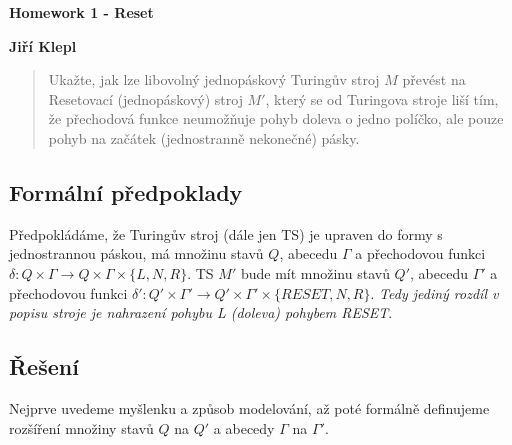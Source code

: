 \documentclass[a4paper,12pt]{article} %
\begin{document}
\thispagestyle{empty} %

\begin{center}
	{\Large \bf Homework 1 - Reset}
	\vspace{2mm}
	
	{\bf Jiří Klepl}
		
\end{center}  

\vspace{0.4cm}

\begin{quote}
Ukažte, jak lze libovolný jednopáskový Turingův stroj $M$ převést na Resetovací (jednopáskový) stroj $M'$, který se od Turingova stroje liší tím, že přechodová funkce neumožňuje pohyb doleva o jedno políčko, ale pouze pohyb na začátek (jednostranně nekonečné) pásky.
\end{quote}

\subsection*{Formální předpoklady}

Předpokládáme, že Turingův stroj (dále jen TS) je upraven do formy s jednostrannou páskou, má množinu stavů $Q$, abecedu $\Gamma$ a přechodovou funkci $\delta : Q \times \Gamma \to Q \times \Gamma \times \{L, N, R\}$. TS $M'$ bude mít množinu stavů $Q'$, abecedu $\Gamma'$ a přechodovou funkci $\delta' : Q' \times \Gamma' \to Q' \times \Gamma' \times \{RESET, N, R\}$. \textit{Tedy jediný rozdíl v popisu stroje je nahrazení pohybu L (doleva) pohybem RESET}.

\subsection*{Řešení}

Nejprve uvedeme myšlenku a způsob modelování, až poté formálně definujeme rozšíření množiny stavů $Q$ na $Q'$ a abecedy $\Gamma$ na $\Gamma'$.
\end{document}
